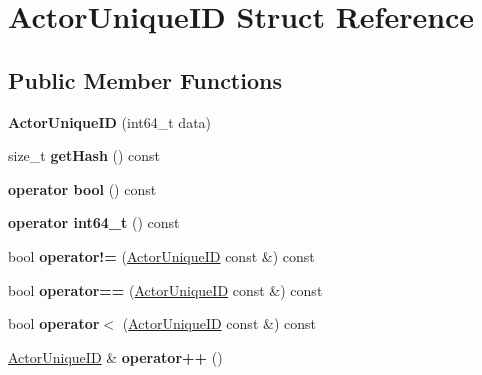 \hypertarget{struct_actor_unique_i_d}{}\section{Actor\+Unique\+ID Struct Reference}
\label{struct_actor_unique_i_d}
\subsection*{Public Member Functions}
\begin{DoxyCompactItemize}
\item 
\mbox{\label{struct_actor_unique_i_d_a7e56dbe95032d232a1d836cf4df3dfba}} 
{\bfseries Actor\+Unique\+ID} (int64\+\_\+t data)
\item 
\mbox{\label{struct_actor_unique_i_d_a488fdf558eb4a000b82092f8594ba5fa}} 
size\+\_\+t {\bfseries get\+Hash} () const
\item 
\mbox{\label{struct_actor_unique_i_d_a82557e3bdea33e02ab50f02578651649}} 
{\bfseries operator bool} () const
\item 
\mbox{\label{struct_actor_unique_i_d_a5462dd7a74b697c6e7653db5773cfb73}} 
{\bfseries operator int64\+\_\+t} () const
\item 
\mbox{\label{struct_actor_unique_i_d_a81b17caa845fd44a6baf65f571f128f3}} 
bool {\bfseries operator!=} (\mbox{\hyperlink{struct_actor_unique_i_d}{Actor\+Unique\+ID}} const \&) const
\item 
\mbox{\label{struct_actor_unique_i_d_a6255332ccbf187772619cdb2cb87113f}} 
bool {\bfseries operator==} (\mbox{\hyperlink{struct_actor_unique_i_d}{Actor\+Unique\+ID}} const \&) const
\item 
\mbox{\label{struct_actor_unique_i_d_a7988c314dcedf70b00ec986d8a94fad1}} 
bool {\bfseries operator$<$} (\mbox{\hyperlink{struct_actor_unique_i_d}{Actor\+Unique\+ID}} const \&) const
\item 
\mbox{\label{struct_actor_unique_i_d_ab8ad69f7493975af585fe17ab0a2c20c}} 
\mbox{\hyperlink{struct_actor_unique_i_d}{Actor\+Unique\+ID}} \& {\bfseries operator++} ()
\end{DoxyCompactItemize}
